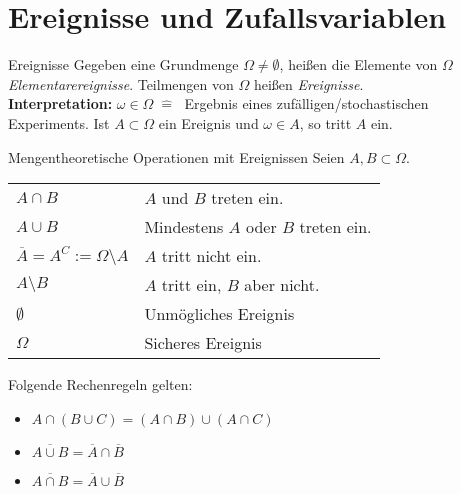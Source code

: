 \section*{Ereignisse und Zufallsvariablen}

\begin{karte}{Ereignisse}
	Gegeben eine Grundmenge $\Omega \neq \emptyset$, heißen die Elemente von $\Omega$ \textit{Elementarereignisse}. Teilmengen von $\Omega$ heißen \textit{Ereignisse}. \\
	\textbf{Interpretation:} $\omega\in\Omega  \;\widehat{=}\;$ Ergebnis eines zufälligen/stochastischen Experiments. Ist $A \subset \Omega$ ein Ereignis und $\omega \in A$, so tritt $A$ ein.
\end{karte}

\begin{karte}{Mengentheoretische Operationen mit Ereignissen}
	Seien $A,B \subset \Omega$. \\
	\begin{center}
		\begin{tabular}{ll}
			$A \cap B$ & \glqq$A$ und $B$ treten ein.\grqq \\
			$A \cup B$ & \glqq Mindestens $A$ oder $B$ treten ein.\grqq \\
			$\overline{A} = A^C := \Omega \setminus A$ & \glqq $A$ tritt nicht ein.\grqq \\
			$A\setminus B$ & \glqq $A$ tritt ein, $B$ aber nicht.\grqq \\
			$\emptyset$ & \glqq Unmögliches Ereignis\grqq \\
			$\Omega$ & \glqq Sicheres Ereignis\grqq
		\end{tabular}
	\end{center}
	Folgende Rechenregeln gelten:
	\begin{itemize}
		\item $A\cap (B \cup C) = (A \cap B) \cup (A \cap C)$
		\item $\overline{A \cup B} = \overline{A} \cap \overline{B}$
		\item $\overline{A \cap B} = \overline{A} \cup \overline{B}$
	\end{itemize}
\end{karte}

